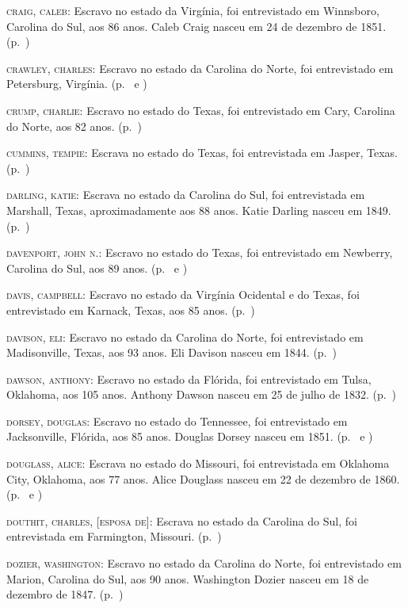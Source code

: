 \begin{Parskip}
\textsc{craig, caleb:} Escravo no estado da Virgínia, foi entrevistado
em Winnsboro, Carolina do Sul, aos 86 anos. Caleb Craig nasceu em 24 de
dezembro de 1851. (p.~\pageref{ref60})

\textsc{crawley, charles:} Escravo no estado da Carolina do Norte, foi
entrevistado em Petersburg, Virgínia. (p.~\pageref{ref61} e \pageref{ref62})

\textsc{crump, charlie:} Escravo no estado do Texas, foi entrevistado em
Cary, Carolina do Norte, aos 82 anos. (p.~\pageref{ref63})

\textsc{cummins, tempie:} Escrava no estado do Texas, foi entrevistada
em Jasper, Texas. (p.~\pageref{ref64})

\textsc{darling, katie:} Escrava no estado da Carolina do Sul, foi
entrevistada em Marshall, Texas, aproximadamente aos 88 anos. Katie
Darling nasceu em 1849. (p.~\pageref{ref65})

\textsc{davenport, john n.:} Escravo no estado do Texas, foi
entrevistado em Newberry, Carolina do Sul, aos 89 anos. (p.~\pageref{ref66} e \pageref{ref67})

\textsc{davis, campbell:} Escravo no estado da Virgínia Ocidental e do
Texas, foi entrevistado em Karnack, Texas, aos 85 anos. (p.~\pageref{ref68})

\textsc{davison, eli:} Escravo no estado da Carolina do Norte, foi
entrevistado em Madisonville, Texas, aos 93 anos. Eli Davison nasceu em
1844. (p.~\pageref{ref69})

\textsc{dawson, anthony:} Escravo no estado da Flórida, foi entrevistado
em Tulsa, Oklahoma, aos 105 anos. Anthony Dawson nasceu em 25 de julho
de 1832. (p.~\pageref{ref70})

\textsc{dorsey, douglas:} Escravo no estado do Tennessee, foi
entrevistado em Jacksonville, Flórida, aos 85 anos. Douglas Dorsey
nasceu em 1851. (p.~\pageref{ref71} e \pageref{ref72})

\textsc{douglass, alice:} Escrava no estado do Missouri, foi
entrevistada em Oklahoma City, Oklahoma, aos 77 anos. Alice Douglass
nasceu em 22 de dezembro de 1860. (p.~\pageref{ref73} e \pageref{ref74})

\textsc{douthit, charles, {[}esposa de{]}:} Escrava no estado da
Carolina do Sul, foi entrevistada em Farmington, Missouri. (p.~\pageref{ref75})

\textsc{dozier, washington:} Escravo no estado da Carolina do Norte, foi
entrevistado em Marion, Carolina do Sul, aos 90 anos. Washington Dozier
nasceu em 18 de dezembro de 1847. (p.~\pageref{ref76})


\end{Parskip}
